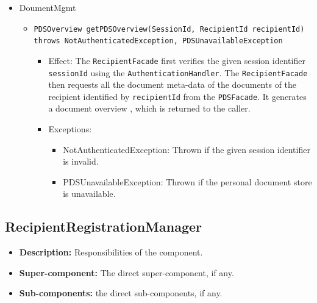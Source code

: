 \documentclass[a4paper,10pt]{article}
\begin{document}
\begin{itemize}
    \item DoumentMgmt
    \begin{itemize}
        \item \texttt{PDSOverview getPDSOverview(SessionId, RecipientId recipientId)\\ throws NotAuthenticatedException, PDSUnavailableException}
        \begin{itemize}
            \item Effect: The \texttt{RecipientFacade} first verifies the given session identifier \texttt{sessionId} using the \texttt{AuthenticationHandler}. The \texttt{RecipientFacade} then requests all the document meta-data of the documents of the recipient identified by \texttt{recipientId} from the \texttt{PDSFacade}. It generates a document overview , which is returned  to the caller.
            \item Exceptions:
             \begin{itemize}
                \item NotAuthenticatedException: Thrown if the given session identifier is invalid.
                \item PDSUnavailableException: Thrown if the personal document store is unavailable.
            \end{itemize}
            	
        \end{itemize}
    \end{itemize}
\end{itemize}

\subsection{RecipientRegistrationManager}
\begin{itemize}
    \item \textbf{Description:} Responsibilities of the component.
    \item \textbf{Super-component:} The direct super-component, if any.
    \item \textbf{Sub-components:} the direct sub-components, if any.
\end{itemize}
\end{document}
